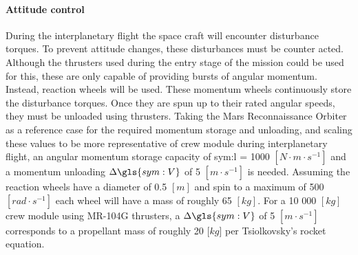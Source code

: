 \paragraph{Attitude control}
During the interplanetary flight the space craft will encounter disturbance torques. To prevent attitude changes, these disturbances must be counter acted. Although the thrusters used during the entry stage of the mission could be used for this, these are only capable of providing bursts of angular momentum. Instead, reaction wheels will be used. These momentum wheels continuously store the disturbance torques. Once they are spun up to their rated angular speeds, they must be unloaded using thrusters. Taking the Mars Reconnaissance Orbiter \cite{You2007} as a reference case for the required momentum storage and unloading, and scaling these values to be more representative of crew module during interplanetary flight, an angular momentum storage capacity of \gls{sym:l} = 1000 $[N \cdot m\cdot s^{-1}]$ and a momentum unloading $\Delta\gls{sym:V}$ of 5 $[m\cdot s^{-1}]$ is needed. Assuming the reaction wheels have a diameter of 0.5 $[m]$ and spin to a maximum of 500 $[rad \cdot s^{-1}]$ each wheel will have a mass of roughly 65 $[kg]$. For a 10 000 $[kg]$ crew module using MR-104G thrusters, a $\Delta\gls{sym:V}$ of 5 $[m\cdot s^{-1}]$ corresponds to a propellant mass of roughly 20 [$kg$] per Tsiolkovsky's rocket equation. 
